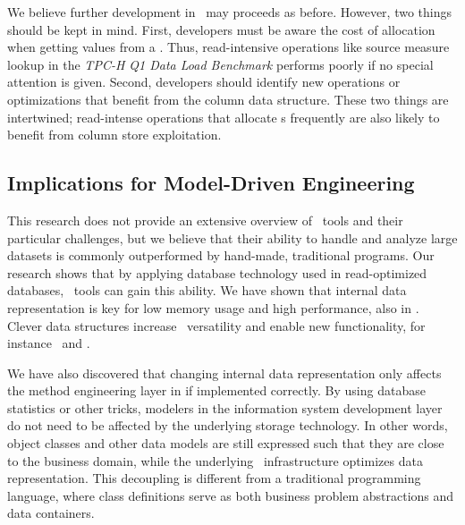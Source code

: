 We believe further development in \gap~may proceeds as before. However, two things should be kept in mind. First, developers must be aware the cost of  allocation when getting values from a . Thus, read-intensive operations like source measure lookup in the \textit{TPC-H Q1 Data Load Benchmark} performs poorly if no special attention is given. Second, developers should identify new operations or optimizations that benefit from the column data structure. These two things are intertwined; read-intense operations that allocate s frequently are also likely to benefit from column store exploitation.

\subsection{Implications for Model-Driven Engineering}
\label{sub:Implications for Model-Driven Engineering}
This research does not provide an extensive overview of \mdd~tools and their particular challenges, but we believe that their ability to handle and analyze large datasets is commonly outperformed by hand-made, traditional programs. Our research shows that by applying database technology used in read-optimized databases, \mde~tools can gain this ability. We have shown that internal data representation is key for low memory usage and high performance, also in \mdd. Clever data structures increase \mde~versatility and enable new functionality, for instance \bi~and \bd.

We have also discovered that changing internal data representation only affects the method engineering layer in \mde if implemented correctly. By using database statistics or other tricks, modelers in the information system development layer do not need to be affected by the underlying storage technology. In other words, object classes and other data models are still expressed such that they are close to the business domain, while the underlying \mde~infrastructure optimizes data representation. This decoupling is different from a traditional programming language, where class definitions serve as both business problem abstractions and data containers.


